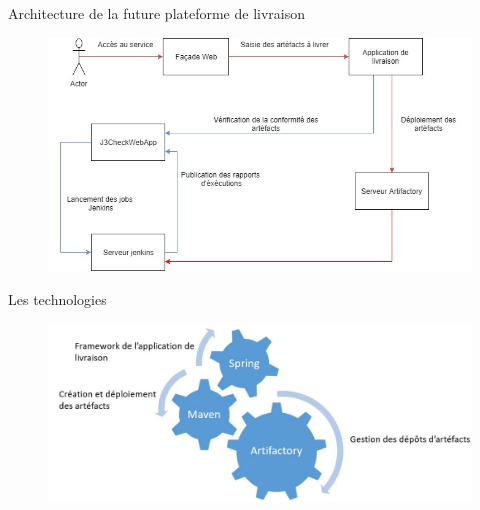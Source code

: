 \documentclass{bredelebeamer}
\begin{document}
\begin{frame}{Architecture de la future plateforme de livraison}
	\begin{figure}
		\centering
		\includegraphics[scale=0.35]{images/workflow.jpg}
	\end{figure}
\end{frame}

\begin{frame}{Les technologies}
	\begin{figure}
		\centering
		\includegraphics[scale=0.45]{images/techno.jpg}
	\end{figure}
\end{frame}
\end{document}
